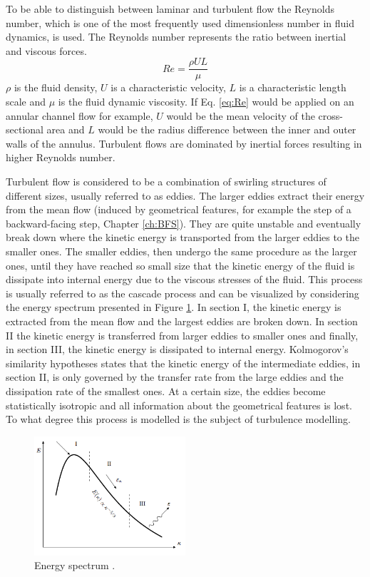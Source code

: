 To be able to distinguish between laminar and turbulent flow the Reynolds number, which is one of the most frequently used dimensionless number in fluid dynamics, is used. The Reynolds number represents the ratio between inertial and viscous forces.
\begin{equation}
  Re = \frac{\rho U L}{\mu}
  \label{eq:Re}
\end{equation}
$\rho$ is the fluid density, $U$ is a characteristic velocity, $L$ is a characteristic length scale and $\mu$ is the fluid dynamic viscosity. If Eq. \ref{eq:Re} would be applied on an annular channel flow for example, $U$ would be the mean velocity of the cross-sectional area and $L$ would be the radius difference between the inner and outer walls of the annulus. Turbulent flows are dominated by inertial forces resulting in higher Reynolds number.

Turbulent flow is considered to be a combination of swirling structures of different sizes, usually referred to as eddies. The larger eddies extract their energy from the mean flow (induced by geometrical features, for example the step of a backward-facing step, Chapter \ref{ch:BFS}). They are quite unstable and eventually break down where the kinetic energy is transported from the larger eddies to the smaller ones. The smaller eddies, then undergo the same procedure as the larger ones, until they have reached so small size that the kinetic energy of the fluid is dissipate into internal energy due to the viscous stresses of the fluid. This process is usually referred to as the cascade process \cite{Cascade} and can be visualized by considering the energy spectrum presented in Figure \ref{fig:cascade}. In section I, the kinetic energy is extracted from the mean flow and the largest eddies are broken down. In section II the kinetic energy is transferred from larger eddies to smaller ones and finally, in section III, the kinetic energy is dissipated to internal energy. Kolmogorov's similarity hypotheses \cite{Cascade} states that the kinetic energy of the intermediate eddies, in section II, is only governed by the transfer rate from the large eddies and the dissipation rate of the smallest ones. At a certain size, the eddies become statistically isotropic and all information about the geometrical features is lost. To what degree this process is modelled is the subject of turbulence modelling.
\begin{figure}[h]
  \centering
  \includegraphics[width=0.5\textwidth]{figures/EnergySpectrum.png}
  \caption{Energy spectrum \cite{Lada}.}\label{fig:cascade}
\end{figure}


